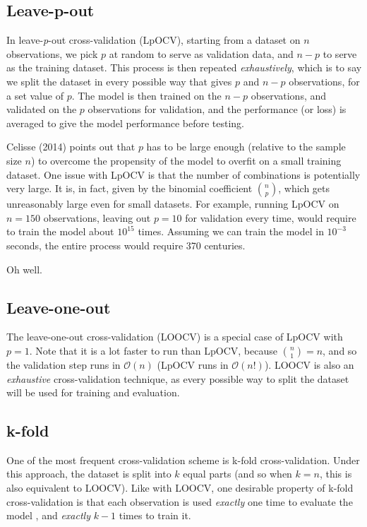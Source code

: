 \documentclass[
  letterpaper,
]{scrbook}
\begin{document}
\subsection{Leave-p-out}\label{leave-p-out}

In leave-\emph{p}-out cross-validation (LpOCV), starting from a dataset
on \(n\) observations, we pick \(p\) at random to serve as validation
data, and \(n-p\) to serve as the training dataset. This process is then
repeated \emph{exhaustively}, which is to say we split the dataset in
every possible way that gives \(p\) and \(n-p\) observations, for a set
value of \(p\). The model is then trained on the \(n-p\) observations,
and validated on the \(p\) observations for validation, and the
performance (or loss) is averaged to give the model performance before
testing.

Celisse (2014) points out that \(p\) has to be large enough (relative to
the sample size \(n\)) to overcome the propensity of the model to
overfit on a small training dataset. One issue with LpOCV is that the
number of combinations is potentially very large. It is, in fact, given
by the binomial coefficient \(\binom{n}{p}\), which gets unreasonably
large even for small datasets. For example, running LpOCV on \(n=150\)
observations, leaving out \(p=10\) for validation every time, would
require to train the model about \(10^{15}\) times. Assuming we can
train the model in \(10^{-3}\) seconds, the entire process would require
370 centuries.

Oh well.

\subsection{Leave-one-out}\label{leave-one-out}

The leave-one-out cross-validation (LOOCV) is a special case of LpOCV
with \(p=1\). Note that it is a lot faster to run than LpOCV, because
\(\binom{n}{1}=n\), and so the validation step runs in
\(\mathcal{O}(n)\) (LpOCV runs in \(\mathcal{O}(n!)\)). LOOCV is also an
\emph{exhaustive} cross-validation technique, as every possible way to
split the dataset will be used for training and evaluation.

\subsection{k-fold}\label{k-fold}

One of the most frequent cross-validation scheme is k-fold
cross-validation. Under this approach, the dataset is split into \(k\)
equal parts (and so when \(k = n\), this is also equivalent to LOOCV).
Like with LOOCV, one desirable property of k-fold cross-validation is
that each observation is used \emph{exactly} one time to evaluate the
model , and \emph{exactly} \(k-1\) times to train it.
\end{document}
